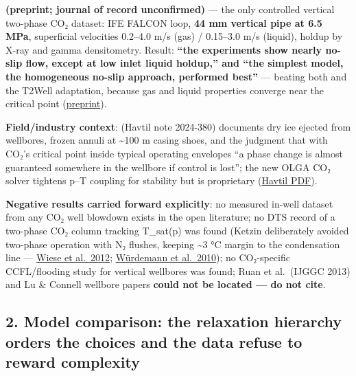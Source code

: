\textbf{\citet{hammer2021} (preprint; journal of record unconfirmed)} --- the only controlled vertical
two-phase CO₂ dataset: IFE FALCON loop, \textbf{44 mm vertical pipe at
6.5 MPa}, superficial velocities 0.2--4.0 m/s (gas) / 0.15--3.0 m/s
(liquid), holdup by X-ray and gamma densitometry. Result: \textbf{``the
experiments show nearly no-slip flow, except at low inlet liquid
holdup,'' and ``the simplest model, the homogeneous no-slip approach,
performed best''} --- beating both \citet{shi2005} and the T2Well adaptation, because gas and liquid properties converge near the critical
point
(\href{https://www.pvv.ntnu.no/~stm/dring/driftflux-well.pdf}{preprint}).

\textbf{Field/industry context}: \citet{wildwell2024} (Havtil note 2024-380) documents dry ice ejected from wellbores, frozen annuli at
\textasciitilde100 m casing shoes, and the judgment that with CO₂'s
critical point inside typical operating envelopes ``a phase change is
almost guaranteed somewhere in the wellbore if control is lost''; the
new OLGA CO₂ solver tightens p--T coupling for stability but is
proprietary
(\href{https://www.havtil.no/contentassets/9b77c8de198b49afb887f9688b45f4be/havtil_co2-blowoutconsiderations_techncialnote_2024-380.pdf}{Havtil
PDF}).

\textbf{Negative results carried forward explicitly}: no measured
in-well dataset from any CO₂ well blowdown exists in the open
literature; no DTS record of a two-phase CO₂ column tracking T\_sat(p)
was found (Ketzin deliberately avoided two-phase operation with N₂
flushes, keeping \textasciitilde3 °C margin to the condensation line ---
\href{https://iahs.info/uploads/dms/15943.50-286-290-355-40-Wiese.pdf}{Wiese
et al.~2012};
\href{https://gfzpublic.gfz-potsdam.de/pubman/item/item_242409_1/component/file_242408/15975.pdf}{Würdemann
et al.~2010}); no CO₂-specific CCFL/flooding study for vertical
wellbores was found; Ruan et al.~(IJGGC 2013) and Lu \& Connell wellbore
papers \textbf{could not be located --- do not cite}.

\hypertarget{model-comparison-the-relaxation-hierarchy-orders-the-choices-and-the-data-refuse-to-reward-complexity}{%
\subsection{2. Model comparison: the relaxation hierarchy orders the
choices and the data refuse to reward
complexity}\label{model-comparison-the-relaxation-hierarchy-orders-the-choices-and-the-data-refuse-to-reward-complexity}}

